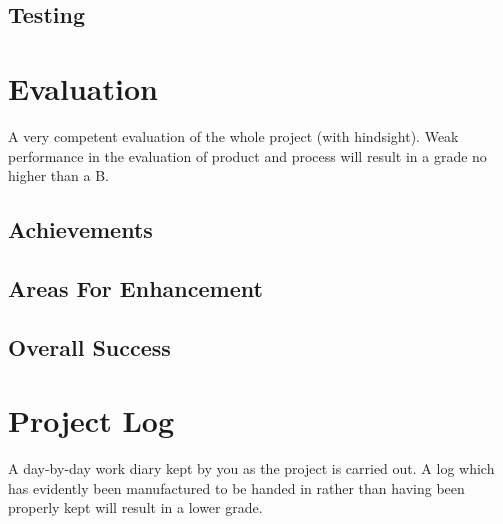 \documentclass[runningheads,a4paper]{llncs}
\begin{document}
	\subsection{Testing}
	
\section{Evaluation}
A very competent evaluation of the whole project (with hindsight). Weak performance in the evaluation of product and process will result in a grade no higher than a B.

	\subsection{Achievements}
	\subsection{Areas For Enhancement}
	\subsection{Overall Success}
	
\section{Project Log}
A day-by-day work diary kept by you as the project is carried out. A log which has evidently been manufactured to be handed in rather than having been properly kept will result in a lower grade.

\newpage


\end{document}
